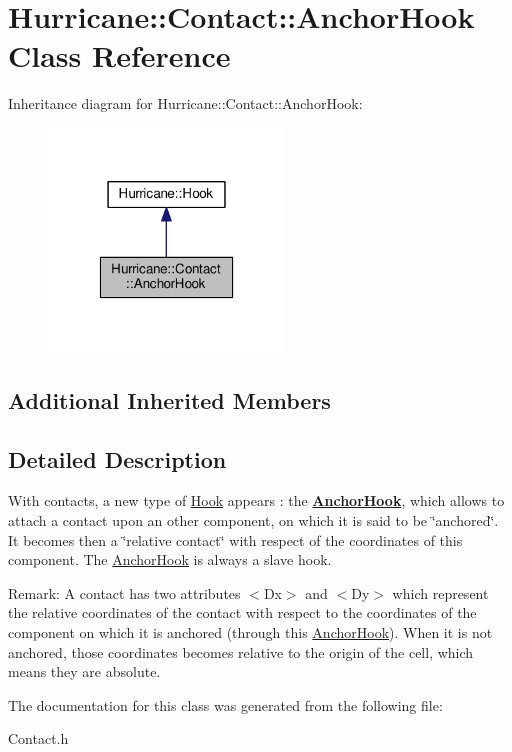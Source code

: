 \hypertarget{classHurricane_1_1Contact_1_1AnchorHook}{}\section{Hurricane\+:\+:Contact\+:\+:Anchor\+Hook Class Reference}
\label{classHurricane_1_1Contact_1_1AnchorHook}


Inheritance diagram for Hurricane\+:\+:Contact\+:\+:Anchor\+Hook\+:\nopagebreak
\begin{figure}[H]
\begin{center}
\leavevmode
\includegraphics[width=178pt]{classHurricane_1_1Contact_1_1AnchorHook__inherit__graph}
\end{center}
\end{figure}
\subsection*{Additional Inherited Members}


\subsection{Detailed Description}
With contacts, a new type of \mbox{\hyperlink{classHurricane_1_1Hook}{Hook}} appears \+: the {\bfseries \mbox{\hyperlink{classHurricane_1_1Contact_1_1AnchorHook}{Anchor\+Hook}}}, which allows to attach a contact upon an other component, on which it is said to be \char`\"{}anchored\char`\"{}. It becomes then a \char`\"{}relative contact\char`\"{} with respect of the coordinates of this component. The \mbox{\hyperlink{classHurricane_1_1Contact_1_1AnchorHook}{Anchor\+Hook}} is always a slave hook.

\begin{DoxyParagraph}{Remark\+: A contact has two attributes {\ttfamily $<$Dx$>$} and {\ttfamily $<$Dy$>$} which }
represent the relative coordinates of the contact with respect to the coordinates of the component on which it is anchored (through this \mbox{\hyperlink{classHurricane_1_1Contact_1_1AnchorHook}{Anchor\+Hook}}). When it is not anchored, those coordinates becomes relative to the origin of the cell, which means they are absolute. 
\end{DoxyParagraph}


The documentation for this class was generated from the following file\+:\begin{DoxyCompactItemize}
\item 
Contact.\+h\end{DoxyCompactItemize}
